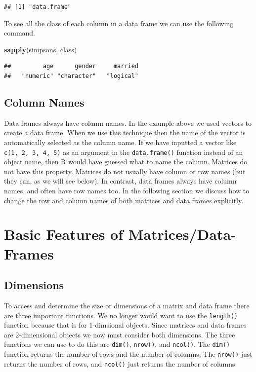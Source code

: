 \documentclass[
]{book}
\newenvironment{Shaded}{\begin{snugshade}}{\end{snugshade}}
\newcommand{\KeywordTok}[1]{\textcolor[rgb]{0.13,0.29,0.53}{\textbf{#1}}}
\newcommand{\NormalTok}[1]{#1}
\begin{document}
\begin{verbatim}
## [1] "data.frame"
\end{verbatim}

To see all the class of each column in a data frame we can use the following command.

\begin{Shaded}
\begin{Highlighting}[]
\KeywordTok{sapply}\NormalTok{(simpsons, class)}
\end{Highlighting}
\end{Shaded}

\begin{verbatim}
##         age      gender     married 
##   "numeric" "character"   "logical"
\end{verbatim}

\hypertarget{column-names}{%
\subsection{Column Names}\label{column-names}}

Data frames always have column names. In the example above we used vectors to create a data frame. When we use this technique then the name of the vector is automatically selected as the column name. If we have inputted a vector like \texttt{c(1,\ 2,\ 3,\ 4,\ 5)} as an argument in the \texttt{data.frame()} function instead of an object name, then R would have guessed what to name the column. Matrices do not have this property. Matrices do not usually have column or row names (but they can, as we will see below). In contrast, data frames always have column names, and often have row names too. In the following section we discuss how to change the row and column names of both matrices and data frames explicitly.

\hypertarget{basic-features-of-matricesdata-frames}{%
\section{Basic Features of Matrices/Data-Frames}\label{basic-features-of-matricesdata-frames}}

\hypertarget{dimensions}{%
\subsection{Dimensions}\label{dimensions}}

To access and determine the size or dimensions of a matrix and data frame there are three important functions. We no longer would want to use the \texttt{length()} function because that is for 1-dimsional objects. Since matrices and data frames are 2-dimensional objects we now must consider both dimensions. The three functions we can use to do this are \texttt{dim()}, \texttt{nrow()}, and \texttt{ncol()}. The \texttt{dim()} function returns the number of rows and the number of columns. The \texttt{nrow()} just returns the number of rows, and \texttt{ncol()} just returns the number of columns.
\end{document}
